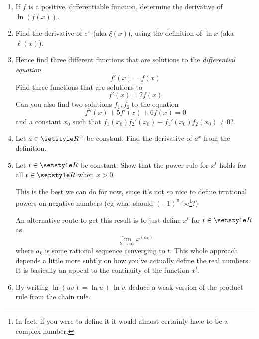 \begin{enumerate}
  If we \emph{define}\footnote{
   One should stress again that this is not the only definition of \(e\)
   (although any correct alternative definition should imply that this one is
   also true)
  } \(e \defeq \xi(1)\), then
  \(e^x \equiv \xi(x \cdot \ell(\xi(1))) \equiv \xi(x)\). So in fact \(\xi\) has
  been the famous ``exponential function'' all this time! This is one of the
  reasons that the number \(e\) is significant. From now on I will write \(e^x\)
  or \(\exp x\) instead of \(\xi(x)\), and \(\ln x\) or
  \(\log x\)\footnote{
   standing for ``natural logarithm'' (logarithmus naturalis) and ``logarithm'',
   respectively.
  }
  instead of \(\ell(x)\).
 \item
  If \(f\) is a positive, differentiable function, determine the derivative of
  \(\ln(f(x))\).
 \item
  Find the derivative of \(e^x\) (aka \(\xi(x)\)), using the definition of
  \(\ln x\) (aka \(\ell(x)\)).
 \item
  Hence find three different functions that are solutions to the
  \emph{differential equation}
  \begin{equation*}
   f'(x) = f(x)
  \end{equation*}
  Find three functions that are solutions to
  \begin{equation*}
   f'(x) = 2f(x)
  \end{equation*}
  Can you also find two solutions \(f_1, f_2\) to the equation
  \begin{equation*}
   f''(x) + 5f'(x) + 6f(x) = 0
  \end{equation*}
  and a constant \(x_0\) such that
  \(f_1(x_0) f_2'(x_0) - f_1'(x_0) f_2(x_0) \ne 0\)?
 \item
  Let \(a \in \Reals^+\) be constant. Find the derivative of \(a^x\) from the
  definition.
 \item
  Let \(t \in \Reals\) be constant. Show that the power rule for \(x^t\) holds
  for all \(t \in \Reals\) when \(x > 0\).

  This is the best we can do for now, since it's not so nice to define
  irrational powers on negative numbers (eg what should \((-1)^\pi\)
  be\footnote{
   In fact, if you were to define it it would almost certainly have to be a
   complex number.
  }?)

  An alternative route to get this result is to just define
  \(x^t\) for \(t \in \Reals\) as
  \begin{equation*}
   \lim_{k \to \infty} x^{(a_k)}
  \end{equation*}
  where \(a_k\) is some rational sequence converging to \(t\). This whole
  approach depends a little more subtly on how you've actually define the real
  numbers. It is basically an appeal to the continuity of the function
  \(x^t\).
 \item
  By writing \(\ln(uv) = \ln u + \ln v\), deduce a weak version of the product
  rule from the chain rule.


\end{enumerate}

